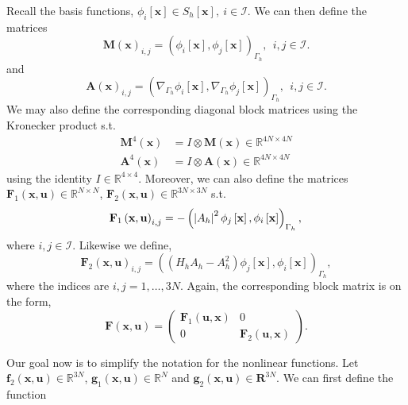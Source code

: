 Recall the basis functions, $\phi_{i} \left[ \mathbf{x} \right] \in S_{h}\left[ \mathbf{x} \right], \   i \in \mathcal{I}  $. We can then define the matrices \[
\mathbf{M}\left( \mathbf{x} \right)_{i,j} =  \left( \phi _{i}\left[ \mathbf{x} \right], \phi_{j} \left[ \mathbf{x} \right] \right) _{ \Gamma _{h}},  \ \   i,j \in \mathcal{I}.
\]
and \[
\mathbf{A}\left( \mathbf{x} \right)_{i,j} = \left( \nabla _{\Gamma _{h}} \phi _{i} \left[ \mathbf{x} \right], \nabla _{\Gamma _{h}}\phi _{j} \left[ \mathbf{x} \right]  \right)_{\Gamma _{h}}, \ \    i,j \in \mathcal{I}.
\]
We may also define the corresponding diagonal block matrices using the Kronecker product s.t.
\[
    \begin{split}
        \mathbf{M}^{4}( \mathbf{x} )  &= I \otimes \mathbf{M}( \mathbf{x}) \in \mathbb{R} ^{4N \times 4N} \\
\mathbf{A}^{4}( \mathbf{x} )   & = I \otimes \mathbf{A}( \mathbf{x}
) \in \mathbb{R} ^{4N \times 4N}
    \end{split}
\]
using the identity $I \in \mathbb{R} ^{4\times 4}$. Moreover, we can also define the matrices $\mathbf{F}_{1} \left( \mathbf{x}, \mathbf{u} \right) \in  \mathbb{R}^{N \times N} $, $\mathbf{F}_{2} \left( \mathbf{x}, \mathbf{u} \right) \in
\mathbb{R}^{3N \times 3N} $  s.t.
\[
    \mathbf{F}_{1}\left( \mathbf{x},\mathbf{u} \right)_{i,j}    = - \left( \left\lvert A_{h} \right\rvert^2  \phi_{j} \left[ \mathbf{x} \right] , \phi_{i} \left[ \mathbf{x} \right]  \right)_{\Gamma _{h}},  \\
\]
where $i,j \in \mathcal{I}  $. Likewise we define,
\[
    \mathbf{F}_{2}\left( \mathbf{x},\mathbf{u} \right)_{i,j}    =  \left( (H_{h} A_{h} - A^2_{h})  \phi_{j} \left[ \mathbf{x} \right] , \phi_{i} \left[ \mathbf{x} \right]  \right)_{\Gamma _{h}},
\]
where the indices are $i,j = 1,\ldots, 3N$.
 Again, the corresponding block matrix is on the form,
\[
\mathbf{F}\left( \mathbf{x}, \mathbf{u} \right) = \begin{pmatrix}
\mathbf{F}_{1}( \mathbf{u}, \mathbf{x} ) &  0 \\
0 &  \mathbf{F}_{2}(\mathbf{u}, \mathbf{x})
\end{pmatrix}.
\]

Our goal now is to simplify the notation for the nonlinear functions. Let $\mathbf{f}_{2}( \mathbf{x}, \mathbf{u}) \in  \mathbb{R} ^{3N} $, $\mathbf{g}_{1}( \mathbf{x}, \mathbf{u}) \in \mathbb{R} ^{N} $ and $\mathbf{g}_{2}( \mathbf{x} , \mathbf{u})
\in \mathbf{R}^{3N} $. We can first define the function

